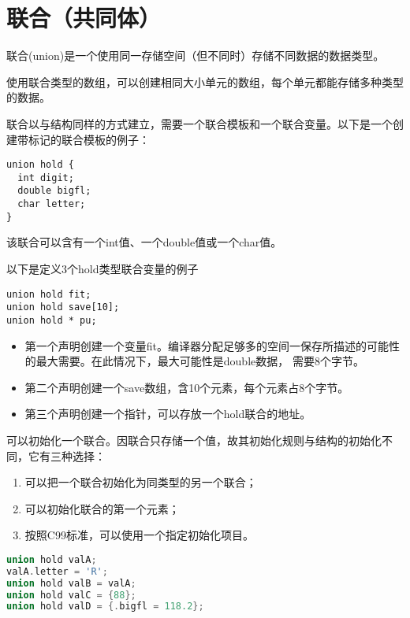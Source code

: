 \section{联合（共同体）}

\begin{frame}[fragile]\ft{\secname}
联合{\tf (union)}是一个使用同一存储空间（但不同时）存储不同数据的数据类型。\vspace{0.1in}


使用联合类型的数组，可以创建相同大小单元的数组，每个单元都能存储多种类型的数据。
\end{frame}


\begin{frame}[fragile]\ft{\secname}
联合以与结构同样的方式建立，需要一个联合模板和一个联合变量。以下是一个创建带标记的联合模板的例子：
\begin{lstlisting}[basicstyle=\ttfamily]
union hold {
  int digit;
  double bigfl;
  char letter;
}  
\end{lstlisting}
该联合可以含有一个{\tf int}值、一个{\tf double}值或一个{\tf char}值。
\end{frame}

\begin{frame}[fragile]\ft{\secname}
以下是定义3个hold类型联合变量的例子
\begin{lstlisting}[basicstyle=\ttfamily]
union hold fit;
union hold save[10];
union hold * pu;
\end{lstlisting}

\begin{itemize}
\item 第一个声明创建一个变量{\tf fit}。编译器分配足够多的空间一保存所描述的可能性的最大需要。在此情况下，最大可能性是{\tf double}数据，
  需要8个字节。\\[0.1in]
\item 第二个声明创建一个{\tf save}数组，含10个元素，每个元素占8个字节。\\[0.1in]
\item 第三个声明创建一个指针，可以存放一个{\tf hold}联合的地址。
\end{itemize}
\end{frame}

\begin{frame}[fragile]\ft{\secname}
可以初始化一个联合。因联合只存储一个值，故其初始化规则与结构的初始化不同，它有三种选择：\vspace{0.05in}

\begin{enumerate}
\item 可以把一个联合初始化为同类型的另一个联合；\\[0.1in]
\item 可以初始化联合的第一个元素；\\[0.1in]
\item 按照C99标准，可以使用一个指定初始化项目。
\end{enumerate}

\begin{lstlisting}[language=c,backgroundcolor=\color{red!20}]
union hold valA;
valA.letter = 'R';
union hold valB = valA;
union hold valC = {88};
union hold valD = {.bigfl = 118.2};
\end{lstlisting}
\end{frame}

